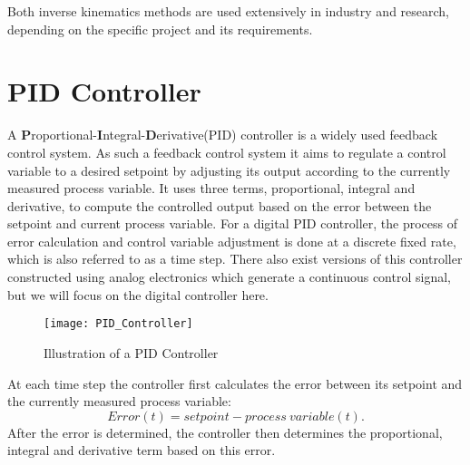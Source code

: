 Both inverse kinematics methods are used extensively in industry and research, depending on the specific project and its requirements.




\section{PID Controller}
A \textbf{P}roportional-\textbf{I}ntegral-\textbf{D}erivative(PID) controller is a widely used feedback control system.
As such a feedback control system it aims to regulate a control variable to a desired setpoint by adjusting its output according to the currently measured process variable.
It uses three terms, proportional, integral and derivative, to compute the controlled output  based on the error between the setpoint and current process variable.
For a digital PID controller, the process of error calculation and control variable adjustment is done at a discrete fixed rate, which is also referred to as a time step.
There also exist versions of this controller constructed using analog electronics which generate a continuous control signal, but we will focus on the digital controller here.

\begin{figure}
	\centerline{\texttt{[image: PID\_Controller]}}
	\caption{Illustration of a PID Controller}
	\label{PID Controller}
\end{figure}

At each time step the controller first calculates the error between its setpoint and the currently measured process variable: 
\[
	Error(t) = setpoint - process\ variable(t)
.\]
After the error is determined, the controller then determines the proportional, integral and derivative term based on this error.

